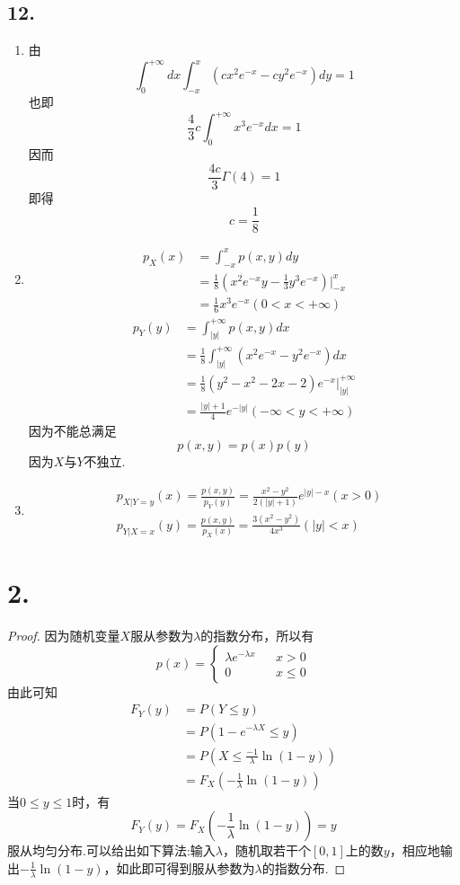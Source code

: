 \documentclass[twocolumn]{article}
\begin{document}
\begin{CJK}{UTF8}{gbsn}
				\subsection*{12.}
					\begin{enumerate}[(1)]
						\item 由\[\int_{0}^{+\infty}dx\int_{-x}^{x}(cx^2e^{-x}-cy^2e^{-x})dy=1\]
						也即\[\frac{4}{3}c\int_{0}^{+\infty}x^3e^{-x}dx=1\]因而\[\frac{4c}{3}\Gamma(4)=1\]即得\[c=\frac{1}{8}\]
						\item \begin{align*}
							p_X(x) & = \int_{-x}^{x}p(x,y)dy\\& = \frac{1}{8}(x^2e^{-x}y-\frac{1}{3}y^3e^{-x})|_{-x}^x \\
							& = \frac{1}{6}x^3e^{-x}(0<x<+\infty)
						\end{align*}
						\begin{align*}
							p_Y(y) & = \int_{|y|}^{+\infty}p(x,y)dx\\
							& = \frac{1}{8}\int_{|y|}^{+\infty}(x^2e^{-x}-y^2e^{-x})dx\\
							& = \frac{1}{8}(y^2-x^2-2x-2)e^{-x}|_{|y|}^{+\infty}\\
							& = \frac{|y|+1}{4}e^{-|y|}(-\infty<y<+\infty)
						\end{align*}
						因为不能总满足\[p(x,y)=p(x)p(y)\]因为$X$与$Y$不独立.
						\item \begin{align*}
							& p_{X|Y=y}(x)=\frac{p(x,y)}{p_Y(y)}=\frac{x^2-y^2}{2(|y|+1)}e^{|y|-x}(x>0)\\
							& p_{Y|X=x}(y)=\frac{p(x,y)}{p_X(x)}=\frac{3(x^2-y^2)}{4x^3}(|y|<x)
						\end{align*}
					\end{enumerate}
			\section*{2.}
				\begin{proof}
					因为随机变量$X$服从参数为$\lambda$的指数分布，所以有\begin{equation*}
					p(x)=\left\{
					\begin{array}{rcl}
					\lambda e^{-\lambda x} & & {x>0}\\
					0 & & {x\le0}
					\end{array} \right.
					\end{equation*}
					由此可知\begin{align*}
						F_Y(y)&=P(Y\le y)\\ & =P(1-e^{-\lambda X}\le y)\\&=P(X\le\frac{-1}{\lambda}\ln(1-y))\\&=F_X(-\frac{1}{\lambda}\ln(1-y))
					\end{align*}
					当$0\le y\le1$时，有\[F_Y(y)=F_X(-\frac{1}{\lambda}\ln(1-y))=y\]服从均匀分布.可以给出如下算法:输入$\lambda$，随机取若干个$[0,1]$上的数$y$，相应地输出$-\frac{1}{\lambda}\ln(1-y)$，如此即可得到服从参数为$\lambda$的指数分布.
				\end{proof}

\end{CJK}
\end{document}
